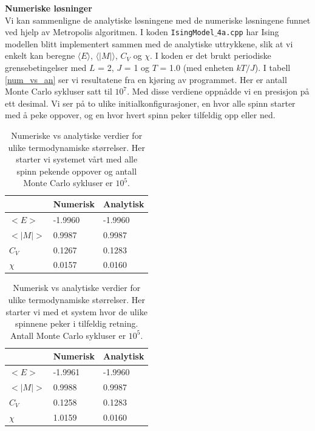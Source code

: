 \documentclass[11pt,a4paper]{article}
\begin{document}
\textbf{Numeriske løsninger}\\
Vi kan sammenligne de analytiske løsningene med de numeriske løsningene funnet ved hjelp av Metropolis algoritmen. I koden \texttt{IsingModel$\_$4a.cpp} har Ising modellen blitt implementert sammen med de analytiske uttrykkene, slik at vi enkelt kan beregne $\langle E \rangle$, $\langle |M| \rangle$, $C_V$ og $\chi$. I koden er det brukt periodiske grensebetingelser med $L$ = 2, $J$ = 1 og $T$ = 1.0 (med enheten $kT/J$). I tabell \ref{num_vs_an} ser vi resultatene fra en kjøring av programmet. Her er antall Monte Carlo sykluser satt til $10^7$. Med disse verdiene oppnådde vi en presisjon på ett desimal. Vi ser på to ulike initialkonfigurasjoner, en hvor alle spinn starter med å peke oppover, og en hvor hvert spinn peker tilfeldig opp eller ned.

\FloatBarrier
\begin{table}[!ht]
\centering
\caption{Numeriske vs analytiske verdier for ulike termodynamiske størrelser. Her starter vi systemet vårt med alle spinn pekende oppover og antall Monte Carlo sykluser er $10^5$.}
\label{num_vs_an_up}
\begin{tabular}{|l|l|l|}
\hline
        & Numerisk & Analytisk \\ \hline
$<E>$   & -1.9960  & -1.9960   \\ \hline
$<|M|>$ & 0.9987   & 0.9987    \\ \hline
$C_V$   & 0.1267   & 0.1283    \\ \hline
$\chi$  & 0.0157   & 0.0160    \\ \hline
\end{tabular}
\end{table}
\FloatBarrier

\FloatBarrier
\begin{table}[!ht]
\centering
\caption{Numerisk vs analytiske verdier for ulike termodynamiske størrelser. Her starter vi med et system hvor de ulike spinnene peker i tilfeldig retning. Antall Monte Carlo sykluser er $10^5$.}
\label{num_vs_an_rand}
\begin{tabular}{|l|l|l|}
\hline
        & Numerisk & Analytisk \\ \hline
$<E>$   & -1.9961  & -1.9960   \\ \hline
$<|M|>$ & 0.9988   & 0.9987    \\ \hline
$C_V$   & 0.1258   & 0.1283    \\ \hline
$\chi$  & 1.0159   & 0.0160    \\ \hline
\end{tabular}
\end{table}
\FloatBarrier
\end{document}
